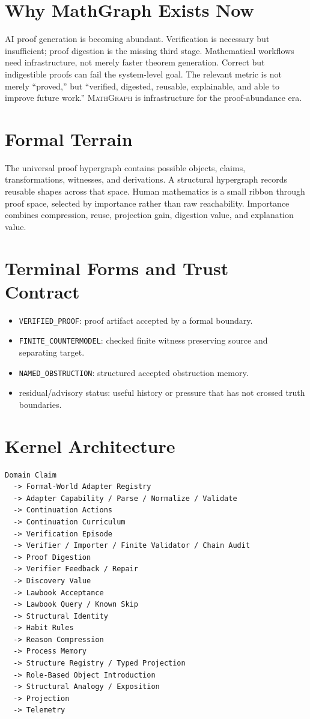 \documentclass[11pt,a4paper]{article}
\newcommand{\MG}{\textsc{MathGraph}}
\begin{document}
\section{Why MathGraph Exists Now}
AI proof generation is becoming abundant. Verification is necessary but insufficient; proof digestion is the missing third stage. Mathematical workflows need infrastructure, not merely faster theorem generation. Correct but indigestible proofs can fail the system-level goal. The relevant metric is not merely ``proved,'' but ``verified, digested, reusable, explainable, and able to improve future work.'' \MG{} is infrastructure for the proof-abundance era.

\section{Formal Terrain}
The universal proof hypergraph contains possible objects, claims, transformations, witnesses, and derivations. A structural hypergraph records reusable shapes across that space. Human mathematics is a small ribbon through proof space, selected by importance rather than raw reachability. Importance combines compression, reuse, projection gain, digestion value, and explanation value.

\section{Terminal Forms and Trust Contract}
\begin{itemize}
\item \texttt{VERIFIED\_PROOF}: proof artifact accepted by a formal boundary.
\item \texttt{FINITE\_COUNTERMODEL}: checked finite witness preserving source and separating target.
\item \texttt{NAMED\_OBSTRUCTION}: structured accepted obstruction memory.
\item residual/advisory status: useful history or pressure that has not crossed truth boundaries.
\end{itemize}

\section{Kernel Architecture}
\begin{lstlisting}
Domain Claim
  -> Formal-World Adapter Registry
  -> Adapter Capability / Parse / Normalize / Validate
  -> Continuation Actions
  -> Continuation Curriculum
  -> Verification Episode
  -> Verifier / Importer / Finite Validator / Chain Audit
  -> Proof Digestion
  -> Verifier Feedback / Repair
  -> Discovery Value
  -> Lawbook Acceptance
  -> Lawbook Query / Known Skip
  -> Structural Identity
  -> Habit Rules
  -> Reason Compression
  -> Process Memory
  -> Structure Registry / Typed Projection
  -> Role-Based Object Introduction
  -> Structural Analogy / Exposition
  -> Projection
  -> Telemetry
\end{lstlisting}
\end{document}
